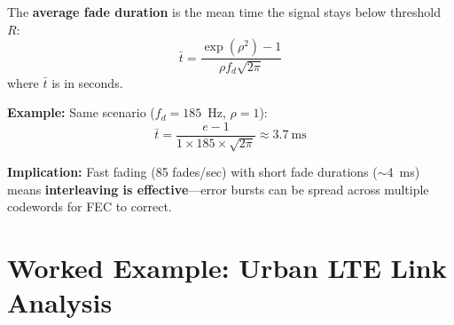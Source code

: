 The \textbf{average fade duration} is the mean time the signal stays below threshold $R$:
\begin{equation}
\bar{t} = \frac{\exp(\rho^2) - 1}{\rho f_d \sqrt{2\pi}}
\end{equation}
where $\bar{t}$ is in seconds.

\textbf{Example:} Same scenario ($f_d = 185$~Hz, $\rho = 1$):
\begin{equation}
\bar{t} = \frac{e - 1}{1 \times 185 \times \sqrt{2\pi}} \approx 3.7~\text{ms}
\end{equation}

\textbf{Implication:} Fast fading (85 fades/sec) with short fade durations ($\sim$4~ms) means \textbf{interleaving is effective}---error bursts can be spread across multiple codewords for FEC to correct.

\section{Worked Example: Urban LTE Link Analysis}

